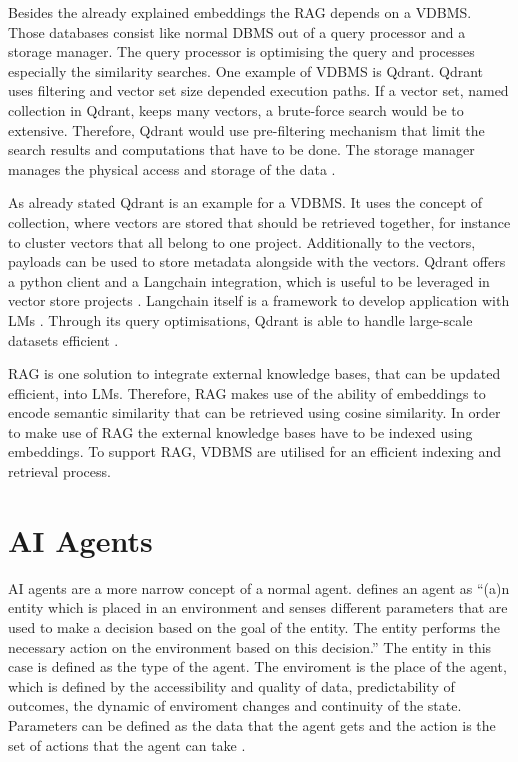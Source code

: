 \documentclass[a4paper,oneside,bibliography=totoc]{scrbook}
\begin{document}
Besides the already explained embeddings the \ac{RAG} depends on a \ac{VDBMS}. Those databases consist like normal \ac{DBMS} out of a query processor and a storage manager. The query processor is optimising the query and processes especially the similarity searches. One example of \ac{VDBMS} is Qdrant. Qdrant uses filtering and vector set size depended execution paths. If a vector set, named collection in Qdrant, keeps many vectors, a brute-force search would be to extensive. Therefore, Qdrant would use pre-filtering mechanism that limit the search results and computations that have to be done. The storage manager manages the physical access and storage of the data \cite{Pan2024}.

As already stated Qdrant is an example for a \ac{VDBMS}. It uses the concept of collection, where vectors are stored that should be retrieved together, for instance to cluster vectors that all belong to one project. Additionally to the vectors, payloads can be used to store metadata alongside with the vectors. Qdrant offers a python client and a Langchain integration, which is useful to be leveraged in vector store projects \cite{Qdrant2025}. Langchain itself is a framework to develop application with \acp{LM} \cite{LangChain2025d}. Through its query optimisations, Qdrant is able to handle large-scale datasets efficient \cite{Qdrant2025,Pan2024}.

\ac{RAG} is one solution to integrate external knowledge bases, that can be updated efficient, into \acp{LM}. Therefore, \ac{RAG} makes use of the ability of embeddings to encode semantic similarity that can be retrieved using cosine similarity. In order to make use of \ac{RAG} the external knowledge bases have to be indexed using embeddings. To support \ac{RAG}, \ac{VDBMS} are utilised for an efficient indexing and retrieval process.

\section{AI Agents}
\label{sec:ai_agents}

\ac{AI} agents are a more narrow concept of a normal agent. \citet{Dorri2018} defines an agent as \enquote{(a)n entity which is placed in an environment and senses different parameters that are used to make a decision based on the goal of the entity. The entity performs the necessary action on the environment based on this decision.} \cite[S. 28574]{Dorri2018} The entity in this case is defined as the type of the agent. The enviroment is the place of the agent, which is defined by the accessibility and quality of data, predictability of outcomes, the dynamic of enviroment changes and continuity of the state. Parameters can be defined as the data that the agent gets and the action is the set of actions that the agent can take \cite{Dorri2018}.
\end{document}
